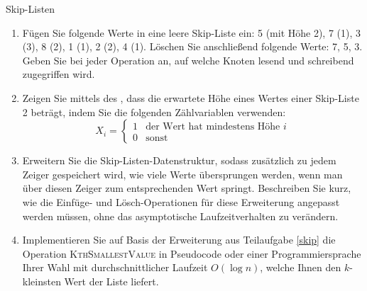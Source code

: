 \documentclass[11pt,a4paper]{article}
\begin{document}
\begin{aufgabe}{2}{Skip-Listen}
    \begin{enumerate}[label=\alph*)]
        \item Fügen Sie folgende Werte in eine leere Skip-Liste ein:
        5 (mit Höhe 2), 7 (1), 3 (3), 8 (2), 1 (1), 2 (2), 4 (1).
        Löschen Sie anschließend folgende Werte: 7, 5, 3.
        Geben Sie bei jeder Operation an, auf welche Knoten lesend und schreibend zugegriffen wird.
        \item Zeigen Sie mittels des , dass die erwartete Höhe eines Wertes einer Skip-Liste 2 beträgt, indem Sie die folgenden Zählvariablen verwenden:
        \begin{equation*}
            X_i = \begin{cases}
                1 & \text{der Wert hat mindestens Höhe $i$} \\
                0 & \text{sonst}
            \end{cases}
        \end{equation*}
        \item\label{skip} 
        Erweitern Sie die Skip-Listen-Datenstruktur, sodass zusätzlich zu jedem Zeiger gespeichert wird, wie viele Werte übersprungen werden, wenn man über diesen Zeiger zum entsprechenden Wert springt.
        Beschreiben Sie kurz, wie die Einfüge- und Lösch-Operationen für diese Erweiterung angepasst werden müssen, ohne das asymptotische Laufzeitverhalten zu verändern.

        \item 
        Implementieren Sie auf Basis der Erweiterung aus Teilaufgabe \ref*{skip} die Operation \textsc{KthSmallestValue} in Pseudocode oder einer Programmiersprache Ihrer Wahl mit durchschnittlicher Laufzeit $O(\log n)$, welche Ihnen den $k$-kleinsten Wert der Liste liefert.
    \end{enumerate}
\end{aufgabe}
\end{document}
